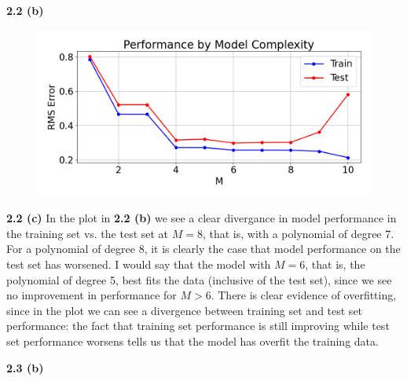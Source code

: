 \documentclass[12 pt]{article}        	%
\begin{document}
\textbf{2.2 (b)}

\begin{figure}[h!]
  \includegraphics[scale=0.5]{rms_model_size.png}
\end{figure}

\textbf{2.2 (c)}
In the plot in \textbf{2.2 (b)} we see a clear divergance in model performance in the training set vs. the test set at $ M = 8 $, 
that is, with a polynomial of degree 7. For a polynomial of degree 8, it is clearly the case that model performance
on the test set has worsened. I would say that the model with $ M = 6 $, that is, the polynomial of degree 5, 
best fits the data (inclusive of the test set), since we see no improvement in performance
for $ M > 6 $. 
There is clear evidence of overfitting, since in the plot we can see a divergence between training set and test set performance:
the fact that training set performance is still improving while test set performance worsens tells us that the model has overfit the training data.

\newpage \textbf{2.3 (b)}
\end{document}

